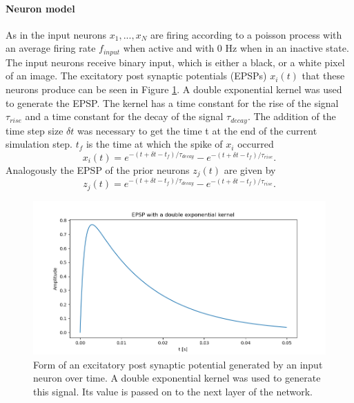 \paragraph{Neuron model}
As in \citet{nessler} the input neurons $x_1,...,x_N$ are firing according to a poisson process with an average firing rate $f_{input}$ when active and with 0 Hz when in an inactive state. The input neurons receive binary input, which is either a black, or a white pixel of an image. The excitatory post synaptic potentials (EPSPs) $x_i(t)$ that these neurons produce can be seen in Figure \ref{fig:XSpike}. A double exponential kernel was used to generate the EPSP. The kernel has a time constant for the rise of the signal $\tau_{rise}$  and a time constant for the decay of the signal $\tau_{decay}$. The addition of the time step size $\delta t$ was necessary to get the time t at the end of the current simulation step. $t_f$ is the time at which the spike of $x_i$ occurred
\begin{equation}
\label{eqn:EPSP}
x_i(t) = e^{-(t + \delta t - t_f) / \tau_{decay}} - e^{-(t + \delta t - t_f) / \tau_{rise}}.
\end{equation}
Analogously the EPSP of the prior neurons $z_j(t)$ are given by
\begin{equation}
\label{eqn:EPSPPrior}
z_j(t) = e^{-(t + \delta t - t_f) / \tau_{decay}} - e^{-(t + \delta t - t_f) / \tau_{rise}}.
\end{equation}

\begin{figure}
  \includegraphics[width=\linewidth]{figures/XSpike.png}
  \caption{Form of an excitatory post synaptic potential generated by an input neuron over time. A double exponential kernel was used to generate this signal. Its value is passed on to the next layer of the network. }
  \label{fig:XSpike}
\end{figure}

